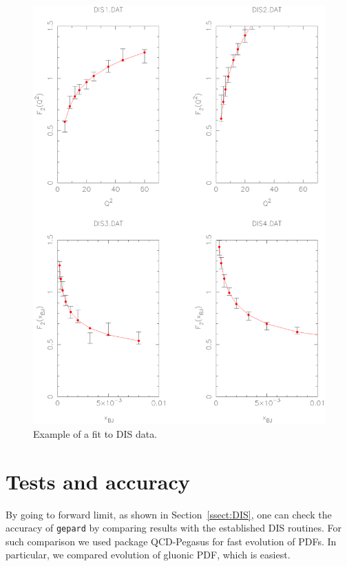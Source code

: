 \documentclass[12pt]{article}
\begin{document}
\begin{figure}
\begin{center}
\includegraphics[scale=0.72]{examplefit}
\end{center}
\caption{Example of a fit to DIS data.}
\label{fig:fitps}
\end{figure}


\section{Tests and accuracy}
\label{sec:tests}

By going to forward limit, as shown in Section~\ref{ssect:DIS}, one can check the accuracy of 
\texttt{gepard} by comparing results with the established DIS routines.
For such comparison we used package {\sc QCD-Pegasus} \cite{Vogt:2004ns} for fast evolution of PDFs.
In particular, we compared evolution of gluonic PDF, which is easiest.
\end{document}
